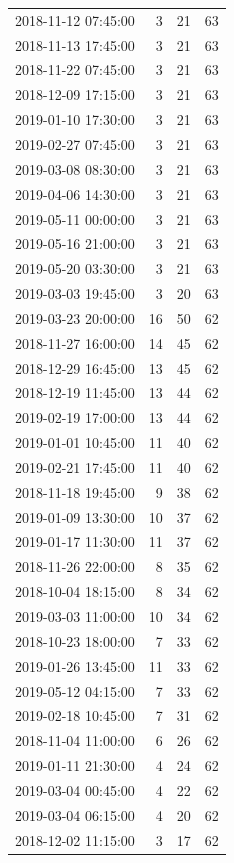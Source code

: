 \begin{tabular}{lrrr}
2018-11-12 07:45:00 & 3 & 21 & 63 \\
2018-11-13 17:45:00 & 3 & 21 & 63 \\
2018-11-22 07:45:00 & 3 & 21 & 63 \\
2018-12-09 17:15:00 & 3 & 21 & 63 \\
2019-01-10 17:30:00 & 3 & 21 & 63 \\
2019-02-27 07:45:00 & 3 & 21 & 63 \\
2019-03-08 08:30:00 & 3 & 21 & 63 \\
2019-04-06 14:30:00 & 3 & 21 & 63 \\
2019-05-11 00:00:00 & 3 & 21 & 63 \\
2019-05-16 21:00:00 & 3 & 21 & 63 \\
2019-05-20 03:30:00 & 3 & 21 & 63 \\
2019-03-03 19:45:00 & 3 & 20 & 63 \\
2019-03-23 20:00:00 & 16 & 50 & 62 \\
2018-11-27 16:00:00 & 14 & 45 & 62 \\
2018-12-29 16:45:00 & 13 & 45 & 62 \\
2018-12-19 11:45:00 & 13 & 44 & 62 \\
2019-02-19 17:00:00 & 13 & 44 & 62 \\
2019-01-01 10:45:00 & 11 & 40 & 62 \\
2019-02-21 17:45:00 & 11 & 40 & 62 \\
2018-11-18 19:45:00 & 9 & 38 & 62 \\
2019-01-09 13:30:00 & 10 & 37 & 62 \\
2019-01-17 11:30:00 & 11 & 37 & 62 \\
2018-11-26 22:00:00 & 8 & 35 & 62 \\
2018-10-04 18:15:00 & 8 & 34 & 62 \\
2019-03-03 11:00:00 & 10 & 34 & 62 \\
2018-10-23 18:00:00 & 7 & 33 & 62 \\
2019-01-26 13:45:00 & 11 & 33 & 62 \\
2019-05-12 04:15:00 & 7 & 33 & 62 \\
2019-02-18 10:45:00 & 7 & 31 & 62 \\
2018-11-04 11:00:00 & 6 & 26 & 62 \\
2019-01-11 21:30:00 & 4 & 24 & 62 \\
2019-03-04 00:45:00 & 4 & 22 & 62 \\
2019-03-04 06:15:00 & 4 & 20 & 62 \\
2018-12-02 11:15:00 & 3 & 17 & 62 \\

\end{tabular}
